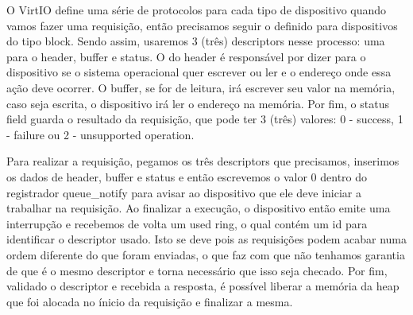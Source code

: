 O VirtIO define uma série de protocolos para cada tipo de dispositivo quando vamos fazer uma requisição, então precisamos seguir o definido para dispositivos do tipo block.
Sendo assim, usaremos 3 (três) descriptors nesse processo: uma para o header, buffer e status.
O do header é responsável por dizer para o dispositivo se o sistema operacional quer escrever ou ler e o endereço onde essa ação deve ocorrer.
O buffer, se for de leitura, irá escrever seu valor na memória, caso seja escrita, o dispositivo irá ler o endereço na memória.
Por fim, o status field guarda o resultado da requisição, que pode ter 3 (três) valores: 0 - success, 1 - failure ou 2 - unsupported operation.


Para realizar a requisição, pegamos os três descriptors que precisamos, inserimos os dados de header, buffer e status e então escrevemos o valor 0 dentro do registrador queue{\_}notify para avisar ao dispositivo que ele deve iniciar a trabalhar na requisição.
Ao finalizar a execução, o dispositivo então emite uma interrupção e recebemos de volta um used ring, o qual contém um id para identificar o descriptor usado. Isto se deve pois as requisições podem 
acabar numa ordem diferente do que foram enviadas, o que faz com que não tenhamos garantia de que é o mesmo descriptor e torna necessário que isso seja checado.
Por fim, validado o descriptor e recebida a resposta, é possível liberar a memória da heap que foi alocada no ínicio da requisição e finalizar a mesma.

\begin{lstlisting}[language=C]
  
\end{lstlisting}